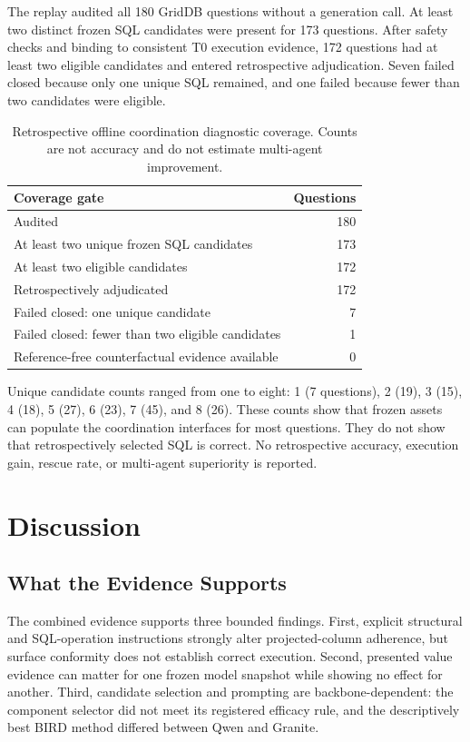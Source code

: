 \documentclass[applsci,article,submit,moreauthors]{Definitions/mdpi}
\begin{document}
The replay audited all 180 GridDB questions without a generation call. At least two distinct frozen SQL candidates were present for 173 questions. After safety checks and binding to consistent T0 execution evidence, 172 questions had at least two eligible candidates and entered retrospective adjudication. Seven failed closed because only one unique SQL remained, and one failed because fewer than two candidates were eligible.

\begin{table}[htbp]
\caption{Retrospective offline coordination diagnostic coverage. Counts are not accuracy and do not estimate multi-agent improvement.}
\label{tab:replay}
\centering
\begin{tabular}{lr}
\toprule
Coverage gate & Questions\\
\midrule
Audited & 180\\
At least two unique frozen SQL candidates & 173\\
At least two eligible candidates & 172\\
Retrospectively adjudicated & 172\\
Failed closed: one unique candidate & 7\\
Failed closed: fewer than two eligible candidates & 1\\
Reference-free counterfactual evidence available & 0\\
\bottomrule
\end{tabular}
\end{table}

Unique candidate counts ranged from one to eight: 1 (7 questions), 2 (19), 3 (15), 4 (18), 5 (27), 6 (23), 7 (45), and 8 (26). These counts show that frozen assets can populate the coordination interfaces for most questions. They do not show that retrospectively selected SQL is correct. No retrospective accuracy, execution gain, rescue rate, or multi-agent superiority is reported.

\section{Discussion}

\subsection{What the Evidence Supports}

The combined evidence supports three bounded findings. First, explicit structural and SQL-operation instructions strongly alter projected-column adherence, but surface conformity does not establish correct execution. Second, presented value evidence can matter for one frozen model snapshot while showing no effect for another. Third, candidate selection and prompting are backbone-dependent: the component selector did not meet its registered efficacy rule, and the descriptively best BIRD method differed between Qwen and Granite.
\end{document}
